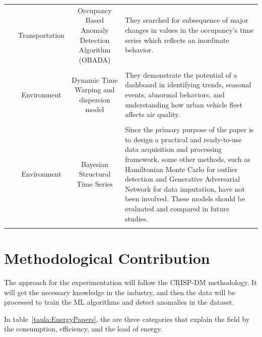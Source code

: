 \documentclass[a4paper,12pt,twoside]{ThesisStyle}
\begin{document}
\begin{landscape}
\begin{longtable}{  l  c  c  l  }
\\
\parbox{1.5cm}{~\cite{Bawaneh2019traffic}} & Transportation & \parbox{3.6cm}{Occupancy Based Anomaly Detection Algorithm (OBADA)} & \parbox{12.5cm}{They searched for subsequence of major changes in values in the occupancy's time series which reflects an inordinate behavior.} \\
\\
\parbox{1.5cm}{~\cite{bachechi2022big}} & Environment & \parbox{3cm}{Dynamic Time Warping and dispersion model} & \parbox{12.5cm}{They demonstrate the potential of a dashboard in identifying trends, seasonal events, abnormal behaviors, and understanding how urban vehicle fleet affects air quality.} \\
\\
\parbox{0.5cm}{~\cite{wu2023gtfs}} & Environment & \parbox{3.5cm}{Bayesian Structural Time Series} & \parbox{12.5cm}{Since the primary purpose of the paper is to design a practical and ready-to-use data acquisition and processing framework, some other methods, such as Hamiltonian Monte Carlo for outlier detection and Generative Adversarial Network for data imputation, have not been involved. These models should be evaluated and compared in future studies.} \\
\\
\hline
\end{longtable}
\end{landscape}

\chapter{Methodological Contribution}
\label{cap:contrib}

The approach for the experimentation will follow the CRISP-DM methodology. It will get the necessary knowledge in the industry, and then the data will be processed to train the ML algorithms and detect anomalies in the dataset.

In table~\ref{taula:EnergyPapers}, the are three categories that explain the field by the consumption, efficiency, and the load of energy. 
\end{document}
